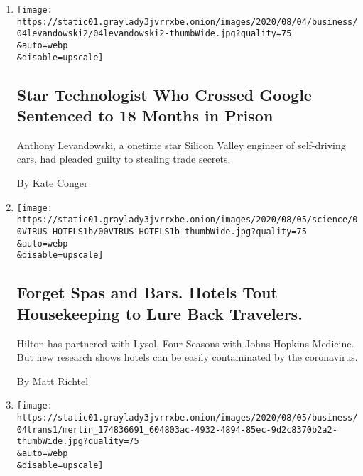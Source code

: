 \begin{enumerate}
\def\labelenumi{\arabic{enumi}.}
\item
  \href{/2020/08/04/technology/levandowski-google-uber-sentencing-trade-secrets.html}{}

  \texttt{[image: https://static01.graylady3jvrrxbe.onion/images/2020/08/04/business/04levandowski2/04levandowski2-thumbWide.jpg?quality=75\\\&auto=webp\\\&disable=upscale]}

  \hypertarget{star-technologist-who-crossed-google-sentenced-to-18-months-in-prison}{%
  \subsection{Star Technologist Who Crossed Google Sentenced to 18
  Months in
  Prison}\label{star-technologist-who-crossed-google-sentenced-to-18-months-in-prison}}

  Anthony Levandowski, a onetime star Silicon Valley engineer of
  self-driving cars, had pleaded guilty to stealing trade secrets.

  By Kate Conger
\item
  \href{/2020/08/04/health/coronavirus-hotels-infect.html}{}

  \texttt{[image: https://static01.graylady3jvrrxbe.onion/images/2020/08/05/science/00VIRUS-HOTELS1b/00VIRUS-HOTELS1b-thumbWide.jpg?quality=75\\\&auto=webp\\\&disable=upscale]}

  \hypertarget{forget-spas-and-bars-hotels-tout-housekeeping-to-lure-back-travelers}{%
  \subsection{Forget Spas and Bars. Hotels Tout Housekeeping to Lure
  Back
  Travelers.}\label{forget-spas-and-bars-hotels-tout-housekeeping-to-lure-back-travelers}}

  Hilton has partnered with Lysol, Four Seasons with Johns Hopkins
  Medicine. But new research shows hotels can be easily contaminated by
  the coronavirus.

  By Matt Richtel
\item
  \href{/2020/08/04/business/recent-commercial-real-estate-transactions.html}{}

  \texttt{[image: https://static01.graylady3jvrrxbe.onion/images/2020/08/05/business/04trans1/merlin\_174836691\_604803ac-4932-4894-85ec-9d2c8370b2a2-thumbWide.jpg?quality=75\\\&auto=webp\\\&disable=upscale]}

  \hypertarget{recent-commercial-real-estate-transactions}{%
}
\end{enumerate}
